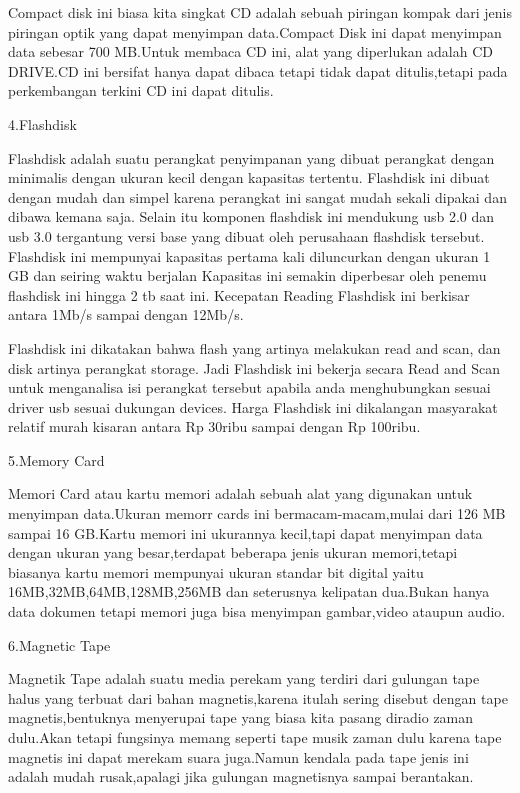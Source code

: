 Compact disk ini biasa kita singkat CD adalah sebuah piringan kompak dari jenis piringan optik yang dapat menyimpan data.Compact Disk ini dapat menyimpan data sebesar 700 MB.Untuk membaca CD ini, alat yang diperlukan adalah CD DRIVE.CD ini bersifat hanya dapat dibaca tetapi tidak dapat ditulis,tetapi pada perkembangan terkini CD ini dapat ditulis.

4.Flashdisk

Flashdisk adalah suatu perangkat penyimpanan yang dibuat perangkat dengan minimalis dengan ukuran kecil dengan kapasitas tertentu. Flashdisk ini dibuat dengan
mudah dan simpel karena perangkat ini sangat mudah sekali dipakai dan dibawa kemana saja. Selain itu komponen flashdisk ini mendukung usb 2.0 dan usb 3.0 tergantung
versi base yang dibuat oleh perusahaan flashdisk tersebut. Flashdisk ini mempunyai kapasitas pertama kali diluncurkan dengan ukuran 1 GB dan seiring waktu berjalan
Kapasitas ini semakin diperbesar oleh penemu flashdisk ini hingga 2 tb saat ini. Kecepatan Reading Flashdisk ini berkisar antara 1Mb/s sampai dengan 12Mb/s.

Flashdisk ini dikatakan bahwa flash yang artinya melakukan read and scan, dan disk artinya perangkat storage. Jadi Flashdisk ini bekerja secara Read and Scan untuk
menganalisa isi perangkat tersebut apabila anda menghubungkan sesuai driver usb sesuai dukungan devices. Harga Flashdisk ini dikalangan masyarakat relatif murah
kisaran antara Rp 30ribu sampai dengan Rp 100ribu.

5.Memory Card

Memori Card atau kartu memori adalah sebuah alat yang digunakan untuk menyimpan data.Ukuran memorr cards ini bermacam-macam,mulai dari 126 MB sampai 16 GB.Kartu memori ini ukurannya kecil,tapi dapat menyimpan data dengan ukuran yang besar,terdapat beberapa jenis ukuran memori,tetapi biasanya kartu memori mempunyai ukuran standar bit digital yaitu 16MB,32MB,64MB,128MB,256MB dan seterusnya kelipatan dua.Bukan hanya data dokumen tetapi memori juga bisa menyimpan gambar,video ataupun audio.

6.Magnetic Tape

Magnetik Tape adalah suatu media perekam yang terdiri dari gulungan tape halus yang terbuat dari bahan magnetis,karena itulah sering disebut dengan tape magnetis,bentuknya menyerupai tape yang biasa kita pasang diradio zaman dulu.Akan tetapi fungsinya memang seperti tape musik zaman dulu karena tape magnetis ini dapat merekam suara juga.Namun kendala pada tape jenis ini adalah mudah rusak,apalagi jika gulungan magnetisnya sampai berantakan.

